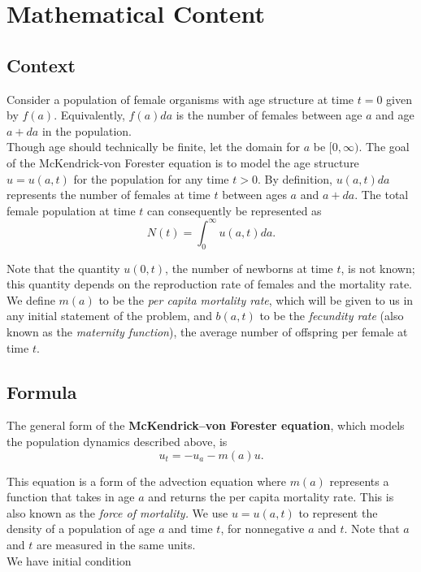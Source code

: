 \section{Mathematical Content}\setcounter{secnumdepth}{2}

\subsection{Context}


Consider a population of female organisms with age structure at time $t=0$ given by $f(a)$. Equivalently, $f(a)da$ is the number of females between age $a$ and age $a+da$ in the population. \\

Though age should technically be finite, let the domain for $a$ be $[0, \infty).$ The goal of the McKendrick-von Forester equation is to model the age structure $u=u(a, t)$ for the population for any time $t > 0$. By definition, $u(a, t) da$ represents the number of females at time $t$ between ages $a$ and $a+da$. The total female population at time $t$ can consequently be represented as
\[ N(t) = \int_0^{\infty} u(a, t) da.\]

Note that the quantity $u(0, t)$, the number of newborns at time $t$, is not known; this quantity depends on the reproduction rate of females and the mortality rate. We define $m(a)$ to be the \textit{per capita mortality rate}, which will be given to us in any initial statement of the problem, and $b(a, t)$ to be the \textit{fecundity rate} (also known as the \textit{maternity function}), the average number of offspring per female at time $t$. 
\subsection{Formula}



The general form of the \textbf{McKendrick–von Forester equation}, which models the population dynamics described above, is
    \[ u_t = -u_a - m(a)u. \]
    
This equation is a form of the advection equation where $m(a)$ represents a function that takes in age $a$ and returns the per capita mortality rate. This is also known as the \emph{force of mortality.} We use $u = u(a, t)$ to represent the density of a population of age $a$ and time $t$, for nonnegative $a$ and $t$. Note that $a$ and $t$ are measured in the same units.  \\

We have initial condition 

